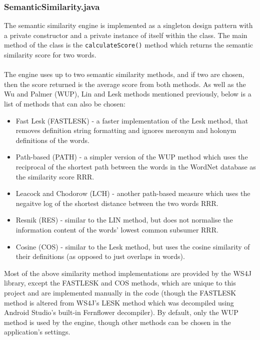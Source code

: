 \documentclass[12pt]{article}
\begin{document}
\subsubsection{SemanticSimilarity.java}

The semantic similarity engine is implemented as a singleton design pattern with a private constructor and a private instance of itself within the class. The main method of the class is the \texttt{calculateScore()} method which returns the semantic similarity score for two words.
\\
\\
The engine uses up to two semantic similarity methods, and if two are chosen, then the score returned is the average score from both methods. As well as the Wu and Palmer (WUP), Lin and Lesk methods mentioned previously, below is a list of methods that can also be chosen: 

\begin{itemize}
\item Fast Lesk (FASTLESK) - a faster implementation of the Lesk method, that removes definition string formatting and ignores meronym and holonym definitions of the words.

\item Path-based (PATH) - a simpler version of the WUP method which uses the reciprocal of the shortest path between the words in the WordNet database as the similarity score RRR.

\item Leacock and Chodorow (LCH) - another path-based measure which uses the negaitve log of the shortest distance between the two words RRR.

\item Resnik (RES) - similar to the LIN method, but does not normalise the information content of the words' lowest common subsumer RRR.

\item Cosine (COS) - similar to the Lesk method, but uses the cosine similarity of their definitions (as opposed to just overlaps in words).
\end{itemize}

Most of the above similarity method implementations are provided by the WS4J library, except the FASTLESK and COS methods, which are unique to this project and are implemented manually in the code (though the FASTLESK method is altered from WS4J's LESK method which was decompiled using Android Studio's built-in Fernflower decompiler). By default, only the WUP method is used by the engine, though other methods can be chosen in the application's settings.
\end{document}
